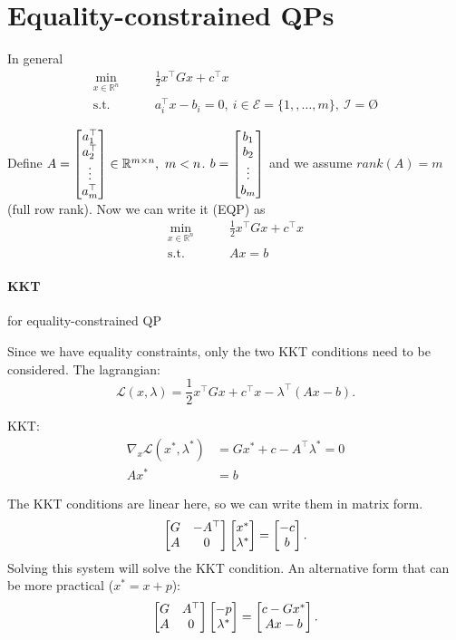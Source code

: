 \documentclass{article}
\begin{document}
\section{Equality-constrained QPs}

In general
\begin{align*}
  \min_{x\in\mathbb{R}^{n}} \qquad& \frac{1}{2}x^{\top}Gx + c^{\top}x \\
  \text{s.t.}\qquad & a_i^{\top}x - b_i = 0,\  i\in \mathcal{E} = \{1,,\dots,m\},\ \mathcal{I} = Ø
\end{align*}

Define $A = \begin{bmatrix} a_1^{\top}  \\ a_2^{\top}  \\  \vdots  \\ a_m^{\top} \end{bmatrix}\in \mathbb{R}^{m\times n},\ m < n$. $b = \begin{bmatrix} b_1 \\ b_2 \\ \vdots \\ b_m \end{bmatrix}$ and we assume $rank(A) = m$ (full row rank).
Now we can write it (EQP) as
\begin{align*}
  \min_{x\in \mathbb{R}^{n}} \qquad& \frac{1}{2}x^{\top}Gx + c^{\top}x \\
  \text{s.t.} \qquad& Ax = b
\end{align*}  

\paragraph{KKT} for equality-constrained QP

Since we have equality constraints, only the two KKT conditions need to be considered. The lagrangian:
\[
  \mathcal{L}(x, \lambda) = \frac{1}{2}x^{\top}Gx + c^{\top}x - \lambda^{\top}(Ax-b) 
.\] 

KKT: 
\begin{align*}
  \nabla_{x}\mathcal{L}(x^*, \lambda^*) &= Gx^*+c - A^{\top}\lambda^* = 0 \\
  Ax^* &= b
\end{align*}

The KKT conditions are linear here, so we can write them in matrix form.
\[
  \begin{bmatrix} G & -A^{\top} \\ A & 0 \end{bmatrix}\begin{bmatrix} x^* \\ \lambda^* \end{bmatrix} = \begin{bmatrix} -c \\ b \end{bmatrix}
.\] 
Solving this system will solve the KKT condition. An alternative form that can be more practical ($x^* = x + p$):
\[
  \begin{bmatrix} G & A^{\top} \\ A & 0 \end{bmatrix}\begin{bmatrix} -p \\ \lambda^* \end{bmatrix} = \begin{bmatrix} c-Gx^* \\ Ax-b \end{bmatrix}
.\] 
\end{document}
